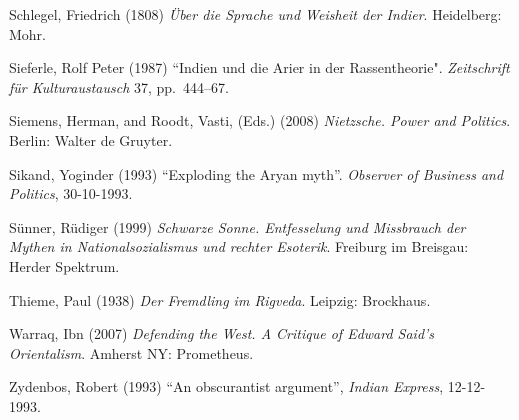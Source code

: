 \begin{thebibliography}{99}
Schlegel, Friedrich (1808) {\sl Über die Sprache und Weisheit der Indier}. Heidelberg: Mohr.

Sieferle, Rolf Peter (1987) ``Indien und die Arier in der Rassentheorie". {\sl Zeitschrift für Kulturaustausch} 37, pp.~444--67.

Siemens, Herman, and Roodt, Vasti, (Eds.) (2008) {\sl Nietzsche. Power and Politics}. Berlin: Walter de Gruyter.

Sikand, Yoginder (1993) “Exploding the Aryan myth”. {\sl Observer of Business and Politics}, 30-10-1993.

Sünner, Rüdiger (1999) {\sl Schwarze Sonne. Entfesselung und Missbrauch der Mythen in Nationalsozialismus und rechter Esoterik}. Freiburg im Breisgau: Herder Spektrum.

Thieme, Paul (1938) {\sl Der Fremdling im Rigveda}. Leipzig: Brockhaus.

Warraq, Ibn (2007) {\sl Defending the West. A Critique of Edward Said’s Orientalism}. Amherst NY: Prometheus.

Zydenbos, Robert (1993) “An obscurantist argument”, {\sl Indian Express}, 12-12-1993.
\end{thebibliography}
